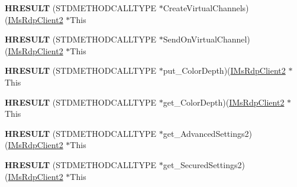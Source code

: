 \begin{DoxyCompactItemize}
\item 
\mbox{\label{struct_m_s_t_s_c_lib_1_1_i_ms_rdp_client2_vtbl_acf1e44098e4868df769f90c73757d209}} 
{\bfseries H\+R\+E\+S\+U\+LT} (S\+T\+D\+M\+E\+T\+H\+O\+D\+C\+A\+L\+L\+T\+Y\+PE $\ast$Create\+Virtual\+Channels)(\hyperlink{interface_m_s_t_s_c_lib_1_1_i_ms_rdp_client2}{I\+Ms\+Rdp\+Client2} $\ast$This
\item 
\mbox{\label{struct_m_s_t_s_c_lib_1_1_i_ms_rdp_client2_vtbl_a850e822a699e6e3e28a18eedcb6e4511}} 
{\bfseries H\+R\+E\+S\+U\+LT} (S\+T\+D\+M\+E\+T\+H\+O\+D\+C\+A\+L\+L\+T\+Y\+PE $\ast$Send\+On\+Virtual\+Channel)(\hyperlink{interface_m_s_t_s_c_lib_1_1_i_ms_rdp_client2}{I\+Ms\+Rdp\+Client2} $\ast$This
\item 
\mbox{\label{struct_m_s_t_s_c_lib_1_1_i_ms_rdp_client2_vtbl_a5ea4593e7445fd62bbe156662e6813ca}} 
{\bfseries H\+R\+E\+S\+U\+LT} (S\+T\+D\+M\+E\+T\+H\+O\+D\+C\+A\+L\+L\+T\+Y\+PE $\ast$put\+\_\+\+Color\+Depth)(\hyperlink{interface_m_s_t_s_c_lib_1_1_i_ms_rdp_client2}{I\+Ms\+Rdp\+Client2} $\ast$This
\item 
\mbox{\label{struct_m_s_t_s_c_lib_1_1_i_ms_rdp_client2_vtbl_ae2735ed5b910cfd108eb1d8ba6d3bc88}} 
{\bfseries H\+R\+E\+S\+U\+LT} (S\+T\+D\+M\+E\+T\+H\+O\+D\+C\+A\+L\+L\+T\+Y\+PE $\ast$get\+\_\+\+Color\+Depth)(\hyperlink{interface_m_s_t_s_c_lib_1_1_i_ms_rdp_client2}{I\+Ms\+Rdp\+Client2} $\ast$This
\item 
\mbox{\label{struct_m_s_t_s_c_lib_1_1_i_ms_rdp_client2_vtbl_acf7bd82d3bdc8ede5dce2c12be30bb05}} 
{\bfseries H\+R\+E\+S\+U\+LT} (S\+T\+D\+M\+E\+T\+H\+O\+D\+C\+A\+L\+L\+T\+Y\+PE $\ast$get\+\_\+\+Advanced\+Settings2)(\hyperlink{interface_m_s_t_s_c_lib_1_1_i_ms_rdp_client2}{I\+Ms\+Rdp\+Client2} $\ast$This
\item 
\mbox{\label{struct_m_s_t_s_c_lib_1_1_i_ms_rdp_client2_vtbl_a4ca5b99f08f4ab54c0940a0ef34eb396}} 
{\bfseries H\+R\+E\+S\+U\+LT} (S\+T\+D\+M\+E\+T\+H\+O\+D\+C\+A\+L\+L\+T\+Y\+PE $\ast$get\+\_\+\+Secured\+Settings2)(\hyperlink{interface_m_s_t_s_c_lib_1_1_i_ms_rdp_client2}{I\+Ms\+Rdp\+Client2} $\ast$This

\end{DoxyCompactItemize}
